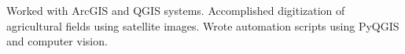 Worked with ArcGIS and QGIS systems. Accomplished digitization of agricultural fields using satellite images. Wrote automation scripts using PyQGIS and computer vision.

